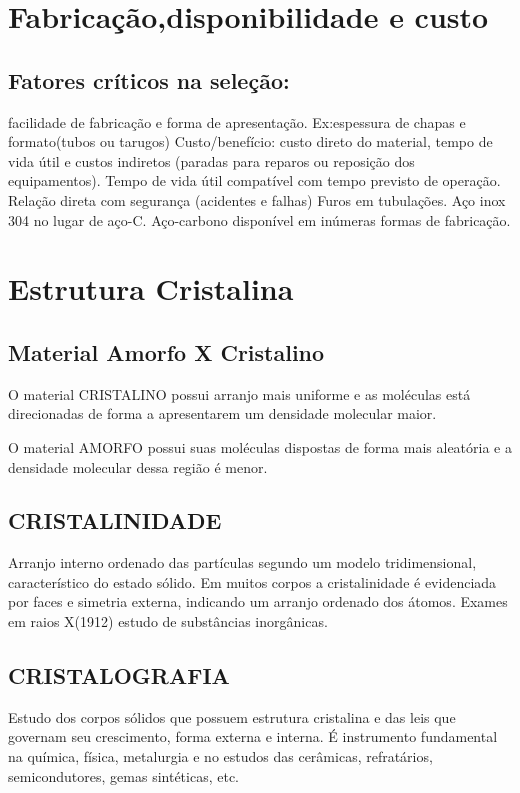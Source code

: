 \section{Fabricação,disponibilidade e custo}


\subsection*{Fatores críticos na seleção:} facilidade de fabricação e forma de apresentação. Ex:espessura de chapas e formato(tubos ou tarugos)
Custo/benefício: custo direto do material, tempo de vida útil e custos indiretos (paradas para reparos ou reposição dos equipamentos).
Tempo de vida útil compatível com tempo previsto de operação.
Relação direta com segurança (acidentes e falhas)
Furos em tubulações.
Aço inox 304 no lugar de aço-C.
Aço-carbono disponível em inúmeras formas de fabricação.


\section{Estrutura Cristalina}

\subsection*{Material Amorfo X Cristalino}
O material CRISTALINO possui arranjo mais uniforme e as moléculas está direcionadas de forma a apresentarem um densidade molecular maior. 

O material AMORFO possui suas moléculas dispostas de forma mais aleatória e a densidade molecular dessa região é menor.


\subsection*{CRISTALINIDADE} Arranjo interno ordenado das partículas segundo um modelo tridimensional, característico do estado sólido. Em muitos corpos a cristalinidade é evidenciada por faces e simetria externa, indicando um arranjo ordenado dos átomos. Exames em raios X(1912) estudo de substâncias inorgânicas.

\subsection*{CRISTALOGRAFIA} Estudo dos corpos sólidos que possuem estrutura cristalina e das leis que governam seu crescimento, forma externa e interna. É instrumento fundamental na química, física, metalurgia e no estudos das cerâmicas, refratários, semicondutores, gemas sintéticas, etc.


